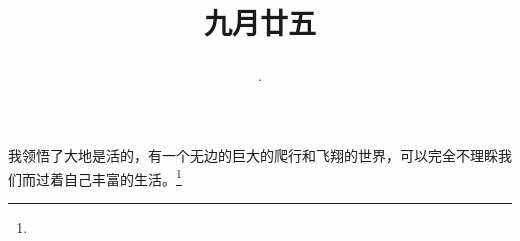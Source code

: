 \title{\date[d=27,m=10,y=2024][year:cn-y,年,month:cn,day:cn,日,·,weekday]·九月廿五 }
我领悟了大地是活的，有一个无边的巨大的爬行和飞翔的世界，可以完全不理睬我们而过着自己丰富的生活。\footnote{ }

